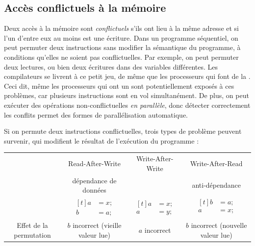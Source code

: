 \subsection{Accès conflictuels à la mémoire}

Deux accès à la mémoire sont \emph{conflictuels} s'ils ont lieu à la
même adresse et si l'un d'entre eux au moins est une écriture. Dans un
programme séquentiel, on peut permuter deux instructions sans modifier
la sémantique du programme, à conditions qu'elles ne soient pas
conflictuelles. Par exemple, on peut permuter deux lectures, ou bien
deux écritures dans des variables différentes. Les compilateurs se
livrent à ce petit jeu, de même que les processeurs qui font de la
. Ceci dit, même les processeurs
 qui ont un  sont potentiellement
exposés à ces problèmes, car plusieurs instructions sont \og en
vol\fg{} simultanément. De plus, on peut exécuter des opérations
non-conflictuelles \emph{en parallèle}, donc détecter correctement les
conflits permet des formes de parallélisation automatique.

Si on permute deux instructions conflictuelles, trois types de
problème peuvent survenir, qui modifient le résultat de l'exécution du programme :

\begin{tabular}{c||c|c|c}
  \hline
  & Read-After-Write & Write-After-Write & Write-After-Read \\
  & dépendance de données & & anti-dépendance \\
\hline
  & {$\begin{aligned}[t]
  a &= x;\\
  b &= a;
\end{aligned}$}
                                                  &
{$\begin{aligned}[t]
  a &= x;\\
  a &= y;
\end{aligned}$}
                              &
{$\begin{aligned}[t]
  b &= a;\\
  a &= x;\\
\end{aligned}$}
  \\
  \hline
  Effet de la permutation & $b$ incorrect (vieille valeur lue) & $a$ incorrect & $b$ incorrect (nouvelle valeur lue) \\
  \hline
\end{tabular}

